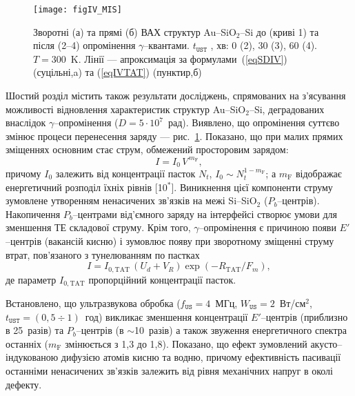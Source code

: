 \begin{figure}[b]
\center
\texttt{[image: figIV\_MIS]}%
\caption{\label{figIV_MIS}
Зворотні (а) та прямі (б) ВАХ структур Au--SiO$_2$--Si до (криві 1)
та після (2--4) опромінення $\gamma$--квантами.
$t_\mathtt{UST}$ , хв: 0 (2), 30 (3), 60 (4).
$T=300$~K.
Лінії --- апроксимація за формулами~(\ref{eqSDIV}) (суцільні,a) та (\ref{eqIVTAT}) (пунктир,б)
}%
\end{figure}

Шостий розділ містить також результати досліджень, спрямованих на з'ясування можливості відновлення характеристик структур Au--SiO$_2$--Si,
деградованих внаслідок $\gamma$--опромінення ($D=5\cdot10^7$~рад).
Виявлено, що опромінення суттєво змінює процеси перенесення заряду --- рис.~\ref{figIV_MIS}.
Показано, що при малих прямих зміщеннях основним стає струм, обмежений просторовим зарядом:
\begin{equation}\label{eqVIsclc}
  I=I_0\,V^{\,m_\mathrm{F}},
\end{equation}
причому $I_0$ залежить від концентрації пасток $N_t$, $I_0\!\sim\!N_t^{1-m_\mathrm{F}}$;
а $m_\mathrm{F}$ відображає енергетичний розподіл їхніх рівнів
[10$^*$].
Виникнення цієї компоненти струму зумовлене утворенням ненасичених зв'язків на межі Si--SiO$_2$ ($P_b$--центрів).
Накопичення $P_b$--центрами від'ємного заряду на інтерфейсі створює умови для зменшення ТЕ складової струму.
Крім того, $\gamma$--опромінення є причиною появи $E'$--центрів (вакансій кисню) і зумовлює появу при зворотному зміщенні струму втрат, пов'язаного з тунелюванням по пастках
\begin{equation}\label{eqIVTAT}
  I=I_{0,\mathrm{TAT}}\,(U_d+V_R)\exp\left(-R_\mathrm{TAT}/F_m\right),
\end{equation}
де параметр $I_{0,\mathrm{TAT}}$ пропорційний концентрації пасток.

Встановлено, що
ультразвукова обробка
($f_\mathtt{US}=4$~МГц, $W_\mathtt{US}=2$~Вт/см$^2$, $t_\mathtt{UST}=(0,5\div1)$~год) викликає зменшення концентрації
$E'$--центрів
(приблизно в 25~разів)
та  $P_b$--центрів
(в $\sim$10~разів)
а також звуження енергетичного спектра останніх ($m_\mathrm{F}$ змінюється з 1,3 до 1,8).
Показано, що ефект зумовлений акусто--індукованою дифузією  атомів кисню та водню, причому ефективність пасивації останніми ненасичених зв'язків залежить
від рівня механічних напруг в околі дефекту.



